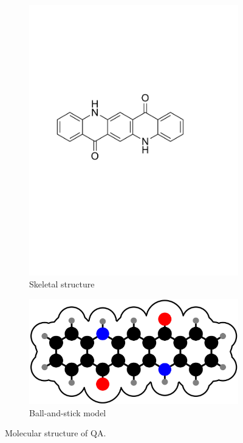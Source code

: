 \begin{figure}[H]
	\centering
	\begin{subfigure}[b]{0.48\linewidth}
		\centering
		\includegraphics[width=\linewidth]{images/QA.pdf}
		\caption{Skeletal structure}
	\end{subfigure}
	\hfill
	\begin{subfigure}[b]{0.48\linewidth}
		\centering
		\includegraphics[width=\linewidth]{images/QA_molecule.png}
		\caption{Ball-and-stick model}
	\end{subfigure}
	\caption{Molecular structure of \acf{QA}.}
	\label{fig:QA}
\end{figure}


